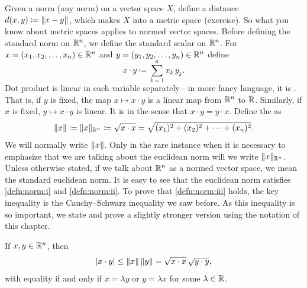 Given a norm (any norm) on a vector space $X$,
define a distance $d(x,y) \coloneqq \lVert {x-y} \rVert$, which
makes $X$ into a metric space (exercise).
So what you know about metric spaces applies to normed vector spaces.
Before defining the standard norm on ${\mathbb{R}}^n$, we
define the standard 
scalar \emph{} on ${\mathbb{R}}^n$.
For 
$x=(x_1,x_2,\ldots,x_n) \in {\mathbb{R}}^n$
and $y=(y_1,y_2,\ldots,y_n) \in {\mathbb{R}}^n$ define
\begin{equation*}
x \cdot y \coloneqq \sum_{k=1}^n x_k\, y_k .
\end{equation*}
Dot product is linear in each variable
separately---in more fancy language, it is \emph{}.
That is,
if $y$ is fixed, the map $x \mapsto x \cdot y$ is a linear map from
${\mathbb{R}}^n$ to ${\mathbb{R}}$.  Similarly, if $x$ is fixed,
$y \mapsto x \cdot y$ is linear.
It is \emph{} in the sense that $x \cdot y = y \cdot x$.
Define the \emph{} as
\begin{equation*}
\lVert {x} \rVert \coloneqq \lVert {x} \rVert_{{\mathbb{R}}^n} \coloneqq \sqrt{x \cdot x} = \sqrt{(x_1)^2+(x_2)^2 + \cdots + (x_n)^2}.
\end{equation*}
We will normally write $\lVert {x} \rVert$.
Only in the rare instance when it is necessary to
emphasize that we are talking about the euclidean norm will we write
$\lVert {x} \rVert_{{\mathbb{R}}^n}$.
Unless otherwise stated, if we talk about ${\mathbb{R}}^n$ as a normed vector space,
we mean the standard euclidean norm.
It is easy to see that the euclidean norm satisfies \ref{defn:norm:i} and
\ref{defn:norm:ii}.  To prove
that \ref{defn:norm:iii} holds, the key
inequality is the Cauchy--Schwarz inequality
we saw before.  As this inequality is so important, we state and
prove a slightly stronger version using the notation of this chapter.

\begin{thm}
If $x, y \in {\mathbb{R}}^n$, then
\begin{equation*}
\sabs{x \cdot y} \leq \snorm{x} \, \snorm{y} = \sqrt{x\cdot x}\, \sqrt{y\cdot y},
\avoidbreak
\end{equation*}
with equality if and only if $x = \lambda y$ or $y = \lambda x$ for some
$\lambda \in {\mathbb{R}}$.
\pagebreak[2]
\end{thm}

